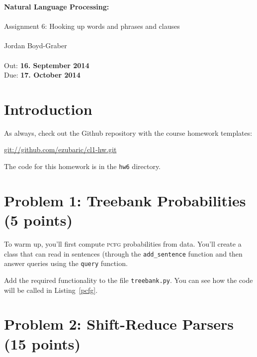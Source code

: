 \documentclass[11pt]{article}
\begin{document}
\begin{center}
{\Large{\textbf{ Natural Language Processing:  }}}\\
\mbox{}\\
{\Large{Assignment 6: Hooking up words and phrases and clauses}}\\
\mbox{}\\
{\large{Jordan Boyd-Graber}}\\
\mbox{}\\
{\large{Out: \textbf{16. September 2014}\\Due: \textbf{17. October 2014}}}\\
\end{center}


{}

\section*{Introduction} %
\label{sec:introduction}
As always, check out the Github repository with the course homework templates:

\url{git://github.com/ezubaric/cl1-hw.git}

The code for this homework is in the \texttt{hw6} directory.

\section*{Problem 1: Treebank Probabilities (5 points)}

To warm up, you'll first compute \textsc{pcfg} probabilities from
data.  You'll create a class that can read in sentences (through the
\texttt{add\_sentence} function and then answer queries using the
\texttt{query} function.

Add the required functionality to the file \texttt{treebank.py}.  You
can see how the code will be called in Listing~\ref{pcfg}.

\section*{Problem 2: Shift-Reduce Parsers (15 points)}
\end{document}
